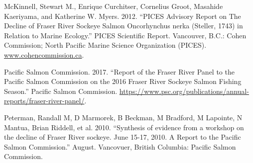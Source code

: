 \documentclass[fleqn,10pt]{wlpeerj} %
\begin{document}
\hypertarget{ref-McKinnell2012}{}
McKinnell, Stewart M., Enrique Curchitser, Cornelius Groot, Masahide
Kaeriyama, and Katherine W. Myers. 2012. ``PICES Advisory Report on The
Decline of Fraser River Sockeye Salmon Oncorhynchus nerka (Steller,
1743) in Relation to Marine Ecology.'' PICES Scientific Report.
Vancouver, B.C.: Cohen Commission; North Pacific Marine Science
Organization (PICES). \url{www.cohencommission.ca}.

\hypertarget{ref-PacificSalmonCommission2017}{}
Pacific Salmon Commission. 2017. ``Report of the Fraser River Panel to
the Pacific Salmon Commission on the 2016 Fraser River Sockeye Salmon
Fishing Season.'' Pacific Salmon Commission.
\url{https://www.psc.org/publications/annual-reports/fraser-river-panel/}.

\hypertarget{ref-Peterman2010}{}
Peterman, Randall M, D Marmorek, B Beckman, M Bradford, M Lapointe, N
Mantua, Brian Riddell, et al. 2010. ``Synthesis of evidence from a
workshop on the decline of Fraser River sockeye. June 15-17, 2010. A
Report to the Pacific Salmon Commission.'' August. Vancovuer, British
Columbia: Pacific Salmon Commission.
\end{document}
